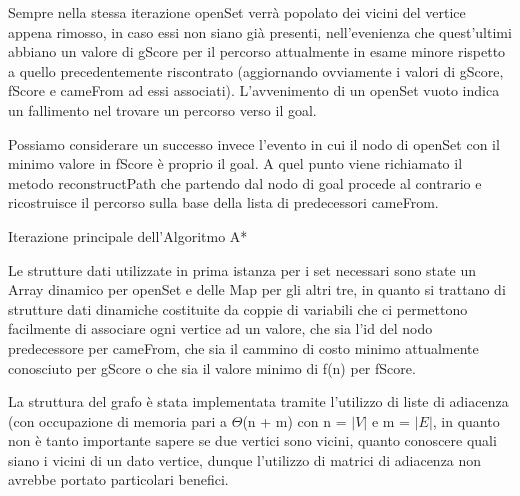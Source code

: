 \documentclass[12pt,a4paper]{report}
\begin{document}
Sempre nella stessa iterazione openSet verrà popolato dei vicini del vertice appena rimosso, in caso essi non siano già presenti, nell'evenienza che quest'ultimi abbiano un valore di gScore per il percorso attualmente in esame minore rispetto a quello precedentemente riscontrato (aggiornando ovviamente i valori di gScore, fScore e cameFrom ad essi associati).
L'avvenimento di un openSet vuoto indica un fallimento nel trovare un percorso verso il goal.

Possiamo considerare un successo invece l'evento in cui il nodo di openSet con il minimo valore in fScore è proprio il goal. A quel punto viene richiamato il metodo reconstructPath che partendo dal nodo di goal procede al contrario e ricostruisce il percorso sulla base della lista di predecessori cameFrom. 

\begin{algorithm}[H]
	\SetAlgoLined
	\caption{Iterazione principale dell'Algoritmo A*}
\end{algorithm}
\bigskip
Le strutture dati utilizzate in prima istanza per i set necessari sono state un Array dinamico per openSet e delle Map per gli altri tre, in quanto si trattano di strutture dati dinamiche costituite da coppie di variabili che ci permettono facilmente di associare ogni vertice ad un valore, che sia l'id del nodo predecessore per cameFrom, che sia il cammino di costo minimo attualmente conosciuto per gScore o che sia il valore minimo di f(n) per fScore.


La struttura del grafo è stata implementata tramite l'utilizzo di liste di adiacenza (con occupazione di memoria pari a \(\Theta\)(n + m) con n = \(|V|\) e m = \(|E|\), in quanto non è tanto importante sapere se due vertici sono vicini, quanto conoscere quali siano i vicini di un dato vertice, dunque l'utilizzo di matrici di adiacenza non avrebbe portato particolari  benefici.
\end{document}
